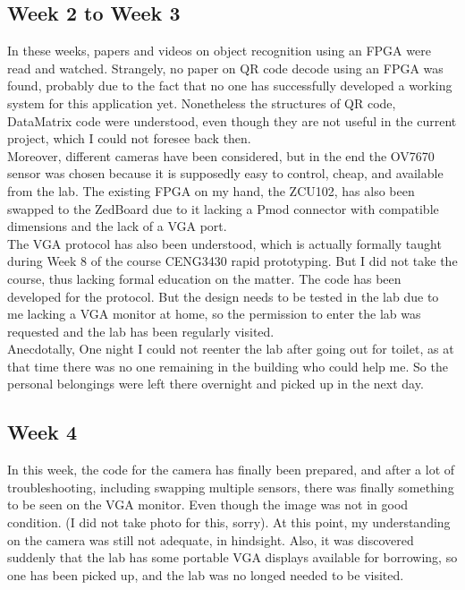 \documentclass{article}
\begin{document}
	\subsection{Week 2 to Week 3}
		In these weeks, papers and videos on object recognition using an FPGA were read and watched. Strangely, no paper on QR code decode using an FPGA was found, probably due to the fact that no one has successfully developed a working system for this application yet. Nonetheless the structures of QR code, DataMatrix code were understood, even though they are not useful in the current project, which I could not foresee back then.
	\\
		
		Moreover, different cameras have been considered, but in the end the OV7670 sensor was chosen because it is supposedly easy to control, cheap, and available from the lab. The existing FPGA on my hand, the ZCU102, has also been swapped to the ZedBoard due to it lacking a Pmod connector with compatible dimensions and the lack of a VGA port.
	\\
		
		The VGA protocol has also been understood, which is actually formally taught during Week 8 of the course CENG3430 rapid prototyping. But I did not take the course, thus lacking formal education on the matter. The code has been developed for the protocol. But the design needs to be tested in the lab due to me lacking a VGA monitor at home, so the permission to enter the lab was requested and the lab has been regularly visited.
	\\
		
		Anecdotally, One night I could not reenter the lab after going out for toilet, as at that time there was no one remaining in the building who could help me. So the personal belongings were left there overnight and picked up in the next day.
	
	\subsection{Week 4}
		In this week, the code for the camera has finally been prepared, and after a lot of troubleshooting, including swapping multiple sensors, there was finally something to be seen on the VGA monitor. Even though the image was not in good condition. (I did not take photo for this, sorry). At this point, my understanding on the camera was still not adequate, in hindsight. Also, it was discovered suddenly that the lab has some portable VGA displays available for borrowing, so one has been picked up, and the lab was no longed needed to be visited.
	
\end{document}
